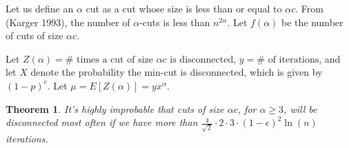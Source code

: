\documentclass[12pt]{article}
\newtheorem{theorem}{Theorem}
\begin{document}
Let us define an $\alpha$ cut as a cut whose size is less than or equal to $\alpha c$. From (Karger 1993), the number of $\alpha$-cuts is less than $n^{2 \alpha}$. Let $f(\alpha)$ be the number of cuts of size $\alpha c$.

Let $Z(\alpha) = \# \text{ times a cut of size } \alpha c \text{ is disconnected}$, $y = \# \text{ of iterations}$, and let $X$ denote the probability the min-cut is disconnected, which is given by $(1 - p)^c$. Let $\mu = E[Z(\alpha)] = yx^\alpha$.

\begin{theorem} It's highly improbable that cuts of size $\alpha c$, for $\alpha \geq 3$, will be disconnected most often if we have more than $\frac{4}{\sqrt{2}} \cdot 2 \cdot 3 \cdot (1-\epsilon)^2 \ln{(n)}$ iterations.
\end{theorem}
\end{document}

